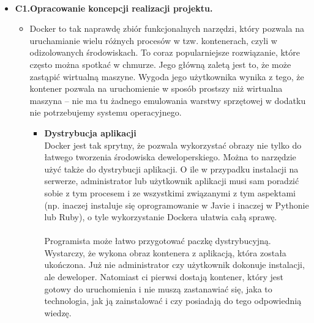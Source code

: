\documentclass[12pt]{article}
\renewcommand{\_}{\kern-1.5pt\textunderscore\kern-1.5pt}
\begin{document}
\vspace{\baselineskip}
\\

\vspace{\baselineskip}\begin{itemize}
	\item \textbf{C1.Opracowanie koncepcji realizacji projektu.}\par

\begin{itemize}
	\item Docker to tak naprawdę zbiór funkcjonalnych narzędzi, który pozwala na uruchamianie wielu różnych procesów w tzw. kontenerach, czyli w odizolowanych środowiskach. To coraz popularniejsze rozwiązanie, które często można spotkać w chmurze. Jego główną zaletą jest to, że może zastąpić wirtualną maszyne. Wygoda jego użytkownika wynika z tego, że kontener pozwala na uruchomienie w sposób prostszy niż wirtualna maszyna – nie ma tu żadnego emulowania warstwy sprzętowej w dodatku nie potrzebujemy systemu operacyjnego.\par

\begin{itemize}
	\item \textbf{Dystrybucja aplikacji\\
}Docker jest tak sprytny, że pozwala wykorzystać obrazy nie tylko do łatwego tworzenia środowiska deweloperskiego. Można to narzędzie użyć także do dystrybucji aplikacji. O ile w przypadku instalacji na serwerze, administrator lub użytkownik aplikacji musi sam poradzić sobie z tym procesem i ze wszystkimi związanymi z tym aspektami (np. inaczej instaluje się oprogramowanie w Javie i inaczej w Pythonie lub Ruby), o tyle wykorzystanie Dockera ułatwia całą sprawę.\\
\\
Programista może łatwo przygotować paczkę dystrybucyjną. Wystarczy, że wykona obraz kontenera z aplikacją, która została ukończona. Już nie administrator czy użytkownik dokonuje instalacji, ale deweloper. Natomiast ci pierwsi dostają kontener, który jest gotowy do uruchomienia i nie muszą zastanawiać się, jaka to technologia, jak ją zainstalować i czy posiadają do tego odpowiednią wiedzę.\par


\end{itemize}
\end{itemize}
\end{itemize}
\end{document}
